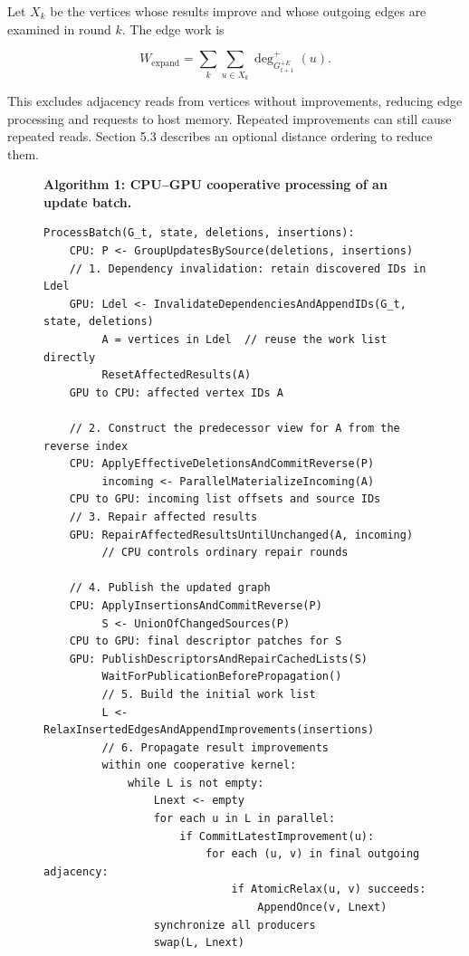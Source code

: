 Let $X_k$ be the vertices whose results improve and whose outgoing edges are examined in round $k$. The edge work is

\begin{equation}
W_{\mathrm{expand}}=
\sum_k\sum_{u\in X_k}\deg^+_{G_{t+1}^{+E}}(u).
\tag{5.3}
\end{equation}

This excludes adjacency reads from vertices without improvements, reducing edge processing and requests to host memory. Repeated improvements can still cause repeated reads. Section 5.3 describes an optional distance ordering to reduce them.


\begin{figure}[t]
\noindent\textbf{Algorithm 1: CPU--GPU cooperative processing of an update batch.}
\footnotesize
\begin{verbatim}
ProcessBatch(G_t, state, deletions, insertions):
    CPU: P <- GroupUpdatesBySource(deletions, insertions)
    // 1. Dependency invalidation: retain discovered IDs in Ldel
    GPU: Ldel <- InvalidateDependenciesAndAppendIDs(G_t, state, deletions)
         A = vertices in Ldel  // reuse the work list directly
         ResetAffectedResults(A)
    GPU to CPU: affected vertex IDs A

    // 2. Construct the predecessor view for A from the reverse index
    CPU: ApplyEffectiveDeletionsAndCommitReverse(P)
         incoming <- ParallelMaterializeIncoming(A)
    CPU to GPU: incoming list offsets and source IDs
    // 3. Repair affected results
    GPU: RepairAffectedResultsUntilUnchanged(A, incoming)
         // CPU controls ordinary repair rounds

    // 4. Publish the updated graph
    CPU: ApplyInsertionsAndCommitReverse(P)
         S <- UnionOfChangedSources(P)
    CPU to GPU: final descriptor patches for S
    GPU: PublishDescriptorsAndRepairCachedLists(S)
         WaitForPublicationBeforePropagation()
         // 5. Build the initial work list
         L <- RelaxInsertedEdgesAndAppendImprovements(insertions)
         // 6. Propagate result improvements
         within one cooperative kernel:
             while L is not empty:
                 Lnext <- empty
                 for each u in L in parallel:
                     if CommitLatestImprovement(u):
                         for each (u, v) in final outgoing adjacency:
                             if AtomicRelax(u, v) succeeds:
                                 AppendOnce(v, Lnext)
                 synchronize all producers
                 swap(L, Lnext)
\end{verbatim}
\end{figure}



